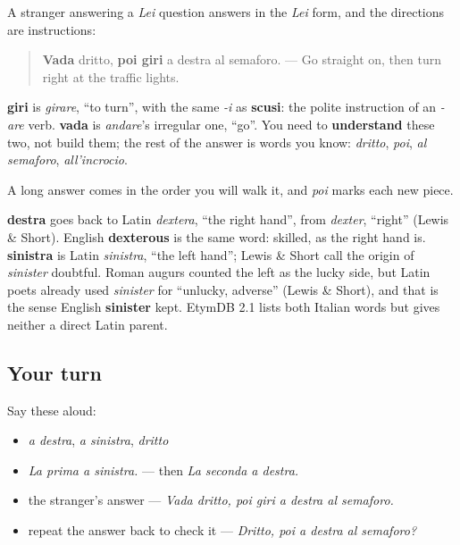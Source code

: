\begin{grammarlens}[title={Grammar Lens: vada dritto, giri a destra}]
A stranger answering a \emph{Lei} question answers in the \emph{Lei} form, and the directions are instructions:

\begin{quote}
\textbf{Vada} dritto, \textbf{poi giri} a destra al semaforo. — Go straight on, then turn right at the traffic lights.
\end{quote}

\textbf{giri} is \emph{girare}, \textquotedblleft{}to turn\textquotedblright{}, with the same \emph{-i} as \textbf{scusi}: the polite instruction of an \emph{-are} verb. \textbf{vada} is \emph{andare}'s irregular one, \textquotedblleft{}go\textquotedblright{}. You need to \textbf{understand} these two, not build them; the rest of the answer is words you know: \emph{dritto}, \emph{poi}, \emph{al semaforo}, \emph{all'incrocio}.

A long answer comes in the order you will walk it, and \emph{poi} marks each new piece.
\end{grammarlens}

\begin{cousinweb}
\textbf{destra} goes back to Latin \emph{dextera}, \textquotedblleft{}the right hand\textquotedblright{}, from \emph{dexter}, \textquotedblleft{}right\textquotedblright{} (Lewis \& Short). English \textbf{dexterous} is the same word: skilled, as the right hand is. \textbf{sinistra} is Latin \emph{sinistra}, \textquotedblleft{}the left hand\textquotedblright{}; Lewis \& Short call the origin of \emph{sinister} doubtful. Roman augurs counted the left as the lucky side, but Latin poets already used \emph{sinister} for \textquotedblleft{}unlucky, adverse\textquotedblright{} (Lewis \& Short), and that is the sense English \textbf{sinister} kept. EtymDB 2.1 lists both Italian words but gives neither a direct Latin parent.
\end{cousinweb}

\subsection*{Your turn}
Say these aloud:

\begin{itemize}
\raggedright
  \item \emph{a destra}, \emph{a sinistra}, \emph{dritto}
  \item \emph{La prima a sinistra.} — then \emph{La seconda a destra.}
  \item the stranger's answer — \emph{Vada dritto, poi giri a destra al semaforo.}
  \item repeat the answer back to check it — \emph{Dritto, poi a destra al semaforo?}
\end{itemize}

